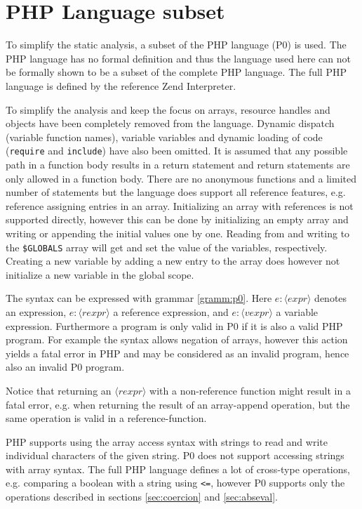 \section{PHP Language subset}
\newcommand{\syn}[1]{\langle\mathit{#1}\rangle}
\label{sec:langsubset}
To simplify the static analysis, a subset of the PHP language (P0) is used. The PHP language has no formal definition and thus the language used here can not be formally shown to be a subset of the complete PHP language. The full PHP language is defined by the reference Zend Interpreter.

To simplify the analysis and keep the focus on arrays, resource handles and objects have been completely removed from the language. Dynamic dispatch (variable function names), variable variables and dynamic loading of code (\texttt{require} and \texttt{include}) have also been omitted. It is assumed that any possible path in a function body results in a return statement and return statements are only allowed in a function body. There are no anonymous functions and a limited number of statements but the language does support all reference features, e.g. reference assigning entries in an array. Initializing an array with references is not supported directly, however this can be done by initializing an empty array and writing or appending the initial values one by one. Reading from and writing to the \texttt{\$GLOBALS} array will get and set the value of the variables, respectively. Creating a new variable by adding a new entry to the array does however not initialize a new variable in the global scope.

The syntax can be expressed with grammar \ref{gramm:p0}. Here $e : \syn{expr}$ denotes an expression, $e : \syn{rexpr}$ a reference expression, and $e : \syn{vexpr}$ a variable expression.   Furthermore a program is only valid in P0 if it is also a valid PHP program. For example the syntax allows negation of arrays, however this action yields a fatal error in PHP and may be considered as an invalid program, hence also an invalid P0 program. 

Notice that returning an $\syn{rexpr}$ with a non-reference function might result in a fatal error, e.g. when returning the result of an array-append operation, but the same operation is valid in a reference-function.

PHP supports using the array access syntax with strings to read and write individual characters of the given string. P0 does not support accessing strings with array syntax. The full PHP language defines a lot of cross-type operations, e.g. comparing a boolean with a string using \texttt{<=}, however P0 supports only the operations described in sections \ref{sec:coercion} and \ref{sec:abseval}.

